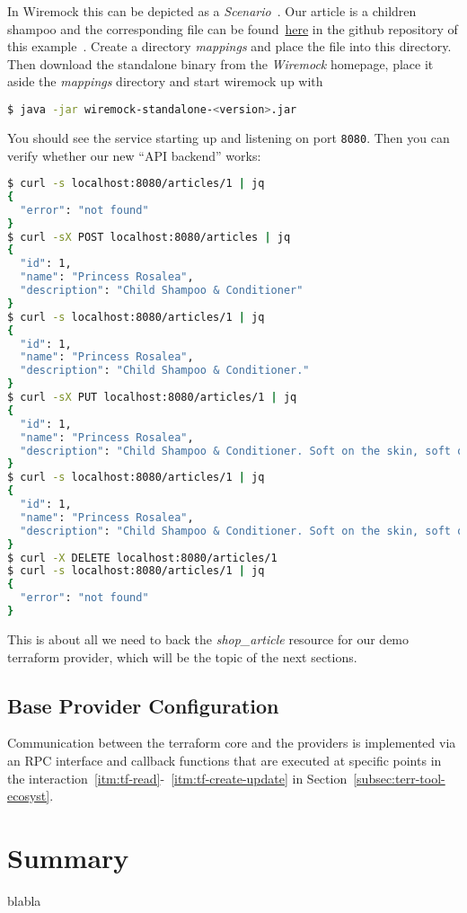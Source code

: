 \documentclass[paper=a4,fontsize=10pt,toc=listof,numbers=noenddot]{article}
\begin{document}
In Wiremock this can be depicted as a \emph{Scenario}~\cite{noauthor_wiremock_stateful_behavior_2025}. Our article is a children shampoo and the corresponding file can be found~\href{https://github.com/ecky-l/terraform-provider-example/blob/main/src/wiremock/mappings/shampoo.json}{here} in the github repository of this example~\cite{ecky-l_terraform-provider-example_nodate}. Create a directory \emph{mappings} and place the file into this directory. Then download the standalone binary from the \emph{Wiremock} homepage, place it aside the \emph{mappings} directory and start wiremock up with

\begin{lstlisting}[language=bash,basicstyle=\ttfamily\footnotesize,numbers=none]
$ java -jar wiremock-standalone-<version>.jar
\end{lstlisting}

You should see the service starting up and listening on port \verb'8080'. Then you can verify whether our new ``API backend'' works:

\begin{lstlisting}[language=bash,basicstyle=\ttfamily\footnotesize,numbers=none]
$ curl -s localhost:8080/articles/1 | jq
{
  "error": "not found"
}
$ curl -sX POST localhost:8080/articles | jq
{
  "id": 1,
  "name": "Princess Rosalea",
  "description": "Child Shampoo & Conditioner"
}
$ curl -s localhost:8080/articles/1 | jq
{
  "id": 1,
  "name": "Princess Rosalea",
  "description": "Child Shampoo & Conditioner."
}
$ curl -sX PUT localhost:8080/articles/1 | jq
{
  "id": 1,
  "name": "Princess Rosalea",
  "description": "Child Shampoo & Conditioner. Soft on the skin, soft on the environment."
}
$ curl -s localhost:8080/articles/1 | jq
{
  "id": 1,
  "name": "Princess Rosalea",
  "description": "Child Shampoo & Conditioner. Soft on the skin, soft on the environment."
}
$ curl -X DELETE localhost:8080/articles/1
$ curl -s localhost:8080/articles/1 | jq
{
  "error": "not found"
}
\end{lstlisting}

This is about all we need to back the \emph{shop\_article} resource for our demo terraform provider, which will be the topic of the next sections.

\subsection{Base Provider Configuration}
\label{subsec:base-prov-conf}



Communication between the terraform core and the providers is implemented via an RPC interface and callback functions that are executed at specific points in the interaction~\ref{itm:tf-read}-~\ref{itm:tf-create-update} in Section~\ref{subsec:terr-tool-ecosyst}.



\section{Summary}

blabla

\printbibliography
\end{document}
